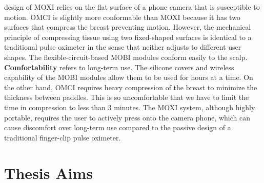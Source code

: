design of \ac{MOXI} relies on the flat surface of a phone camera that is susceptible to motion. \ac{OMCI} is slightly more conformable than \ac{MOXI} because it has two surfaces that compress the breast preventing motion. However, the mechanical principle of compressing tissue using two fixed-shaped surfaces is identical to a traditional pulse oximeter in the sense that neither adjusts to different user shapes. The flexible-circuit-based \ac{MOBI} modules conform easily to the scalp. \textbf{Comfortability} refers to long-term use. The silicone covers and wireless capability of the \ac{MOBI} modules allow them to be used for hours at a time. On the other hand, \ac{OMCI} requires heavy compression of the breast to minimize the thickness between paddles. This is so uncomfortable that we have to limit the time in compression to less than 3 minutes. The \ac{MOXI} system, although highly portable, requires the user to actively press onto the camera phone, which can cause discomfort over long-term use compared to the passive design of a traditional finger-clip pulse oximeter. 



\section{Thesis Aims}
\label{chap:background:aims}


